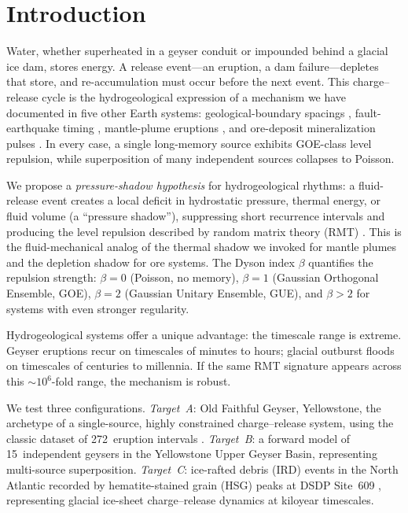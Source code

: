 \documentclass[12pt,a4paper]{article}
\begin{document}
\section{Introduction}

Water, whether superheated in a geyser conduit or impounded behind a glacial ice dam, stores energy. A release event---an eruption, a dam failure---depletes that store, and re-accumulation must occur before the next event. This charge--release cycle is the hydrogeological expression of a mechanism we have documented in five other Earth systems: geological-boundary spacings \citep{chen2026geo}, fault-earthquake timing \citep{chen2026fault}, mantle-plume eruptions \citep{chen2026plume}, and ore-deposit mineralization pulses \citep{chen2026metal}. In every case, a single long-memory source exhibits GOE-class level repulsion, while superposition of many independent sources collapses to Poisson.

We propose a \emph{pressure-shadow hypothesis} for hydrogeological rhythms: a fluid-release event creates a local deficit in hydrostatic pressure, thermal energy, or fluid volume (a ``pressure shadow''), suppressing short recurrence intervals and producing the level repulsion described by random matrix theory (RMT) \citep{wigner1957,mehta2004}. This is the fluid-mechanical analog of the thermal shadow we invoked for mantle plumes and the depletion shadow for ore systems. The Dyson index $\beta$ quantifies the repulsion strength: $\beta=0$ (Poisson, no memory), $\beta=1$ (Gaussian Orthogonal Ensemble, GOE), $\beta=2$ (Gaussian Unitary Ensemble, GUE), and $\beta>2$ for systems with even stronger regularity.

Hydrogeological systems offer a unique advantage: the timescale range is extreme. Geyser eruptions recur on timescales of minutes to hours; glacial outburst floods on timescales of centuries to millennia. If the same RMT signature appears across this $\sim$$10^6$-fold range, the mechanism is robust.

We test three configurations. \emph{Target~A}: Old Faithful Geyser, Yellowstone, the archetype of a single-source, highly constrained charge--release system, using the classic dataset of 272~eruption intervals \citep{azzalini1990}. \emph{Target~B}: a forward model of 15~independent geysers in the Yellowstone Upper Geyser Basin, representing multi-source superposition. \emph{Target~C}: ice-rafted debris (IRD) events in the North Atlantic recorded by hematite-stained grain (HSG) peaks at DSDP Site~609 \citep{bond1999,obrochta2012}, representing glacial ice-sheet charge--release dynamics at kiloyear timescales.
\end{document}
